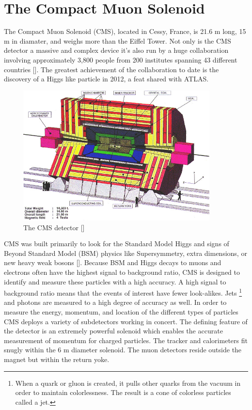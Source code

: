 \section{The Compact Muon Solenoid}

The Compact Muon Solenoid (CMS), located in Cessy, France, is 21.6 m long, 15 m in diamater, and weighs more than the Eiffel Tower. Not only is the CMS detector a massive and complex device it's also run by a huge collaboration involving approximately 3,800 people from 200 institutes spanning 43 different countries [\cite{cmscollab}]. The greatest achievement of the collaboration to date is the discovery of a Higgs like particle in 2012, a feat shared with ATLAS.

\begin{figure}[h!]
  \centering
  \includegraphics[width=4in]{images/CMSdetc3D.jpg}
  \caption
   {The CMS detector [\cite{cmsweb}]}
  \label{fig:cmsdet3d}
\end{figure}

CMS was built primarily to look for the Standard Model Higgs and signs of Beyond Standard Model (BSM) physics like Supersymmetry, extra dimensions, or new heavy weak bosons [\cite{tdr}]. Because BSM and Higgs decays to muons and electrons often have the highest signal to background ratio, CMS is designed to identify and measure these particles with a high accuracy. A high signal to background ratio means that the events of interest have fewer look-alikes. Jets \footnote{When a quark or gluon is created, it pulls other quarks from the vacuum in order to maintain colorlessness. The result is a cone of colorless particles called a jet.} and photons are measured to a high degree of accuracy as well. In order to measure the energy, momentum, and location of the different types of particles CMS deploys a variety of subdetectors working in concert. The defining feature of the detector is an extremely powerful solenoid which enables the accurate measurement of momentum for charged particles. The tracker and calorimeters fit snugly within the 6 m diameter solenoid. The muon detectors reside outside the magnet but within the return yoke.

